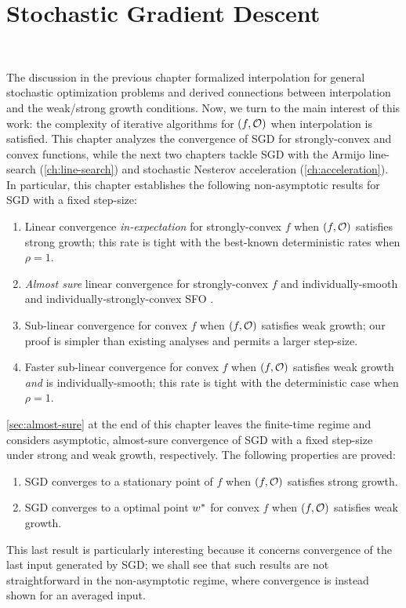 
\chapter{Stochastic Gradient Descent}~\label{ch:sgd}

The discussion in the previous chapter formalized interpolation for general stochastic optimization problems and derived connections between interpolation and the weak/strong growth conditions.  
Now, we turn to the main interest of this work: the complexity of iterative algorithms for \( \rbr{f, \oracle{}} \) when interpolation is satisfied. 
This chapter analyzes the convergence of \ac{SGD} for strongly-convex and convex functions, while the next two chapters tackle \ac{SGD} with the Armijo line-search (\autoref{ch:line-search}) and stochastic Nesterov acceleration (\autoref{ch:acceleration}).
In particular, this chapter establishes the following non-asymptotic results for \ac{SGD} with a fixed step-size: 
\begin{enumerate}
    \item Linear convergence \emph{in-expectation} for strongly-convex \( f \) when \( \rbr{f, \oracle{}} \) satisfies strong growth; this rate is tight with the best-known deterministic rates when \( \rho = 1 \).
    \item \emph{Almost sure} linear convergence for strongly-convex \( f \) and individually-smooth and individually-strongly-convex \ac{SFO} \oracle{}. 
    \item Sub-linear convergence for convex \( f \) when \( \rbr{f, \oracle{}} \) satisfies weak growth; our proof is simpler than existing analyses and permits a larger step-size.
    \item Faster sub-linear convergence for convex \( f \) when \( \rbr{f, \oracle{}} \) satisfies weak growth \emph{and} \oracle{} is individually-smooth; this rate is tight with the deterministic case when \( \rho = 1 \).
\end{enumerate}
\autoref{sec:almost-sure} at the end of this chapter leaves the finite-time regime and considers asymptotic, almost-sure convergence of \ac{SGD} with a fixed step-size under strong and weak growth, respectively.
The following properties are proved: 
\begin{enumerate}
    \item \ac{SGD} converges to a stationary point of \( f \) when \( \rbr{f, \oracle{}} \) satisfies strong growth.
    \item \ac{SGD} converges to a optimal point \( \wopt \) for convex \( f \) when \( \rbr{f, \oracle{}} \) satisfies weak growth.
\end{enumerate}
This last result is particularly interesting because it concerns convergence of the last input generated by \ac{SGD};
we shall see that such results are not straightforward in the non-asymptotic regime, where convergence is instead shown for an averaged input. 

